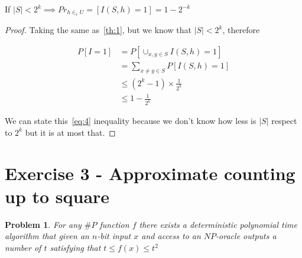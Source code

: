 \documentclass[12pt, a4paper]{article}
\begin{document}
\begin{2k}
  If $|S| < 2^k \implies Pr_{h \in_r U} = \left[ I(S,h) = 1 \right] = 1 - 2^{-k}$
\end{2k}

\begin{proof}
  Taking the same as~\ref{th:1}, but we know that $|S| < 2^k$, therefore

  \begin{subequations}
    \begin{align}
      P[I =  1] &= P \left[ \cup_{x,y \in S} I(S,h) = 1 \right]\\
      &= \sum_{x \neq y \in S} P[I(S,h) = 1] \\
      &\leq (2^k - 1) \times \frac{1}{2^k}\label{eq:4}\\
      &\leq 1 - \frac{1}{2^k}
    \end{align}
  \end{subequations}

  We can state this~\ref{eq:4} inequality because we don't know how less is $|S|$ respect to $2^k$ but it is at most that.
\end{proof}

\section{Exercise 3 - Approximate counting up to square}
\newtheorem{a-counting}{Problem}
\begin{a-counting}
  For any $\#P$ function $f$ there exists a \textit{deterministic} polynomial time algorithm that given an $n$-bit input $x$ and access to an $NP$-oracle outputs a number of $t$ satisfying that $t \leq f(x) \leq t^2$
\end{a-counting}
\end{document}
